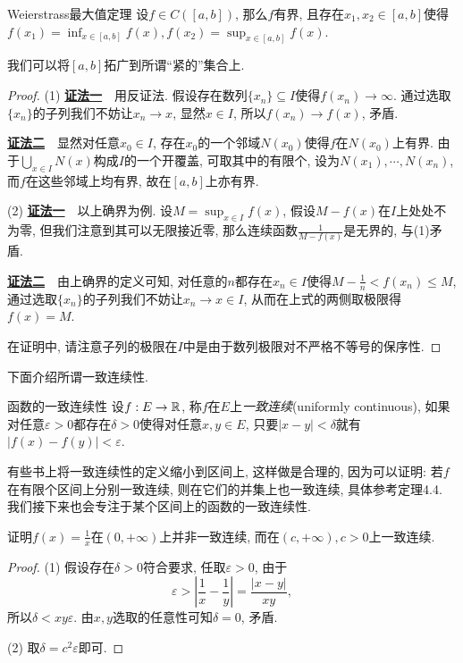 \begin{theorem}{Weierstrass最大值定理}
	设$f \in C([a,b])$, 那么$f$有界, 且存在$x_1,x_2 \in [a,b]$使得$f(x_1) = \inf_{x \in [a,b]} f(x), f(x_2) = \sup_{x \in [a,b]}f(x)$. 
\end{theorem}
\begin{remark}
	我们可以将$[a,b]$拓广到所谓“紧的”集合上. 
\end{remark}
\begin{proof}
	(1) \underline{\textbf{证法一}}~~用反证法. 假设存在数列$\{ x_n \} \subseteq I$使得$f(x_n) \to \infty$. 通过选取$\{ x_n \}$的子列我们不妨让$x_n \to x$, 显然$x \in I$, 所以$f(x_n) \to f(x)$, 矛盾. 
	
	\underline{\textbf{证法二}}~~显然对任意$x_0 \in I$, 存在$x_0$的一个邻域$N(x_0)$使得$f$在$N(x_0)$上有界. 由于$\bigcup_{x \in I} N(x)$构成$I$的一个开覆盖, 可取其中的有限个, 设为$N(x_1), \cdots ,N(x_n)$, 而$f$在这些邻域上均有界, 故在$[a,b]$上亦有界. 
	
	(2) \underline{\textbf{证法一}}~~以上确界为例. 设$M=\sup_{x \in I}f(x)$, 假设$M-f(x)$在$I$上处处不为零, 但我们注意到其可以无限接近零, 那么连续函数$\frac{1}{M-f(x)}$是无界的, 与(1)矛盾. 
	
	\underline{\textbf{证法二}}~~由上确界的定义可知, 对任意的$n$都存在$x_n \in I$使得$M-\frac{1}{n} < f(x_n) \leq M$, 通过选取$\{x_n\}$的子列我们不妨让$x_n \to x \in I$, 从而在上式的两侧取极限得$f(x)=M$. 
	
	在证明中, 请注意子列的极限在$I$中是由于数列极限对不严格不等号的保序性. 
\end{proof}

下面介绍所谓一致连续性. 

\begin{definition}{函数的一致连续性}
	设$f:E \to \mathbb{R}$, 称$f$在$E$上\textit{一致连续}(uniformly continuous), 如果对任意$\varepsilon >0$都存在$\delta >0$使得对任意$x,y \in E$, 只要$|x-y|<\delta$就有$|f(x)-f(y)|<\varepsilon$. 
\end{definition}
\begin{remark}
	有些书上将一致连续性的定义缩小到区间上, 这样做是合理的, 因为可以证明: 若$f$在有限个区间上分别一致连续, 则在它们的并集上也一致连续, 具体参考定理4.4. 我们接下来也会专注于某个区间上的函数的一致连续性. 
\end{remark}

\begin{example}
	证明$f(x)=\frac{1}{x}$在$(0,+\infty)$上并非一致连续, 而在$(c ,+\infty ), c >0$上一致连续. 
\end{example}
\begin{proof}
	(1) 假设存在$\delta >0$符合要求, 任取$\varepsilon >0$, 由于$$\varepsilon > |\frac{1}{x}-\frac{1}{y}| = \frac{|x-y|}{xy},$$
	所以$\delta <xy\varepsilon$. 由$x,y$选取的任意性可知$\delta =0$, 矛盾. 
	
	(2) 取$\delta = c^2\varepsilon$即可. 
\end{proof}

